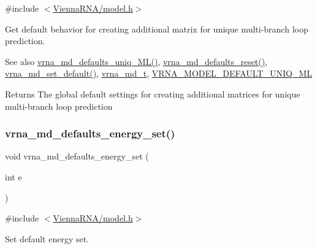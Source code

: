 {\ttfamily \#include $<$\mbox{\hyperlink{model_8h}{Vienna\+R\+N\+A/model.\+h}}$>$}



Get default behavior for creating additional matrix for unique multi-\/branch loop prediction. 

\begin{DoxySeeAlso}{See also}
\mbox{\hyperlink{group__model__details_ga59b944f61c5d2babec2d4c48c820de67}{vrna\+\_\+md\+\_\+defaults\+\_\+uniq\+\_\+\+M\+L()}}, \mbox{\hyperlink{group__model__details_ga70834424cf804d149937de89f80ceb45}{vrna\+\_\+md\+\_\+defaults\+\_\+reset()}}, \mbox{\hyperlink{group__model__details_ga8ac6ff84936282436f822644bf841f66}{vrna\+\_\+md\+\_\+set\+\_\+default()}}, \mbox{\hyperlink{group__model__details_ga1f8a10e12a0a1915f2a4eff0b28ea17c}{vrna\+\_\+md\+\_\+t}}, \mbox{\hyperlink{group__model__details_ga63f6006a02ba2d89148441f406c309e7}{V\+R\+N\+A\+\_\+\+M\+O\+D\+E\+L\+\_\+\+D\+E\+F\+A\+U\+L\+T\+\_\+\+U\+N\+I\+Q\+\_\+\+ML}} 
\end{DoxySeeAlso}
\begin{DoxyReturn}{Returns}
The global default settings for creating additional matrices for unique multi-\/branch loop prediction 
\end{DoxyReturn}
\mbox{\label{group__model__details_ga8dd29c55787a4576277e1907e92d810c}} 
\subsubsection{\texorpdfstring{vrna\+\_\+md\+\_\+defaults\+\_\+energy\+\_\+set()}{vrna\_md\_defaults\_energy\_set()}}
{\footnotesize\ttfamily void vrna\+\_\+md\+\_\+defaults\+\_\+energy\+\_\+set (\begin{DoxyParamCaption}\item[{int}]{e }\end{DoxyParamCaption})}



{\ttfamily \#include $<$\mbox{\hyperlink{model_8h}{Vienna\+R\+N\+A/model.\+h}}$>$}



Set default energy set. 


